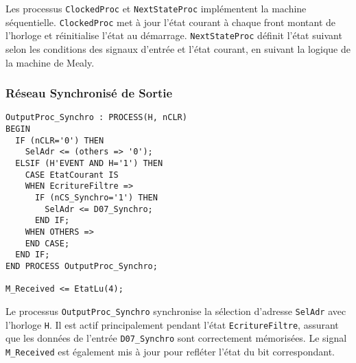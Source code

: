 Les processus \texttt{ClockedProc} et \texttt{NextStateProc} implémentent la machine séquentielle. \texttt{ClockedProc} met à jour l’état courant à chaque front montant de l’horloge et réinitialise l’état au démarrage. \texttt{NextStateProc} définit l’état suivant selon les conditions des signaux d’entrée et l’état courant, en suivant la logique de la machine de Mealy.

\subsubsection{Réseau Synchronisé de Sortie}

\begin{lstlisting}[style=VHDLStyle, caption={Reseau Synchronisé de Sortie}]
OutputProc_Synchro : PROCESS(H, nCLR)
BEGIN 
  IF (nCLR='0') THEN
    SelAdr <= (others => '0');
  ELSIF (H'EVENT AND H='1') THEN 
    CASE EtatCourant IS 
    WHEN EcritureFiltre =>
      IF (nCS_Synchro='1') THEN
        SelAdr <= D07_Synchro;
      END IF;
    WHEN OTHERS =>
    END CASE;
  END IF;
END PROCESS OutputProc_Synchro;
  
M_Received <= EtatLu(4);

\end{lstlisting}

Le processus \texttt{OutputProc\_Synchro} synchronise la sélection d’adresse \texttt{SelAdr} avec l’horloge \texttt{H}. Il est actif principalement pendant l’état \texttt{EcritureFiltre}, assurant que les données de l’entrée \texttt{D07\_Synchro} sont correctement mémorisées. Le signal \texttt{M\_Received} est également mis à jour pour refléter l’état du bit correspondant.